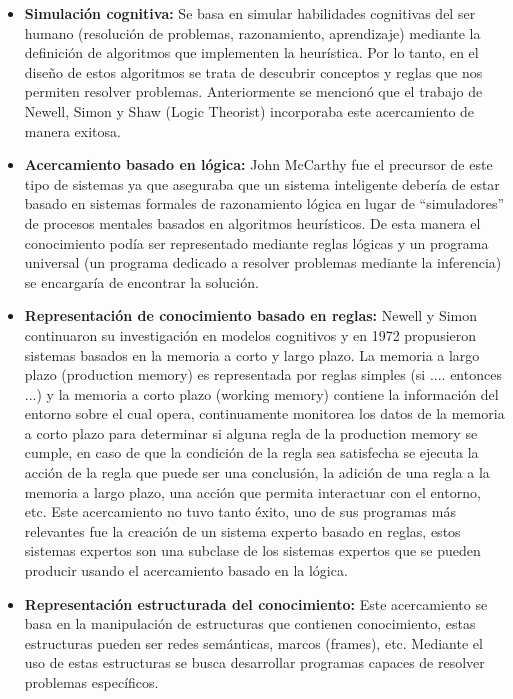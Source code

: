\documentclass[11pt,fleqn]{book} %
\begin{document}
\begin{itemize}
\item \textbf{Simulación cognitiva:} Se basa en simular habilidades cognitivas del ser humano (resolución de problemas, razonamiento, aprendizaje) mediante la definición de algoritmos que implementen la heurística. Por lo tanto, en el diseño de estos algoritmos se trata de descubrir conceptos y reglas que nos permiten resolver problemas. Anteriormente se mencionó que el trabajo de Newell, Simon y Shaw (Logic Theorist) incorporaba este acercamiento de manera exitosa.
\item \textbf{Acercamiento basado en lógica:} John McCarthy fue el precursor de este tipo de sistemas ya que aseguraba que un sistema inteligente debería de estar basado en sistemas formales de razonamiento lógica en lugar de “simuladores” de procesos mentales basados en algoritmos heurísticos. De esta manera el conocimiento podía ser representado mediante reglas lógicas y un programa universal (un programa dedicado a resolver problemas mediante la inferencia) se encargaría de encontrar la solución.
\item \textbf{Representación de conocimiento basado en reglas:} Newell y Simon continuaron su investigación en modelos cognitivos y en 1972 propusieron sistemas basados en la memoria a corto y largo plazo. La memoria a largo plazo (production memory) es representada por reglas simples (si .... entonces ...) y la memoria a corto plazo (working memory) contiene la información del entorno sobre el cual opera, continuamente monitorea los datos de la memoria a corto plazo para determinar si alguna regla de la production memory se cumple, en caso de que la condición de la regla sea satisfecha se ejecuta la acción de la regla que puede ser una conclusión, la adición de una regla a la memoria a largo plazo, una acción que permita interactuar con el entorno, etc.
Este acercamiento no tuvo tanto éxito, uno de sus programas más relevantes fue la creación de un sistema experto basado en reglas, estos sistemas expertos son una subclase de los sistemas expertos que se pueden producir usando el acercamiento basado en la lógica.
\item \textbf{Representación estructurada del conocimiento:} Este acercamiento se basa en la manipulación de estructuras que contienen conocimiento, estas estructuras pueden ser redes semánticas, marcos (frames), etc. 
Mediante el uso de estas estructuras se busca desarrollar programas capaces de  resolver problemas específicos.
\end{itemize}
\end{document}
